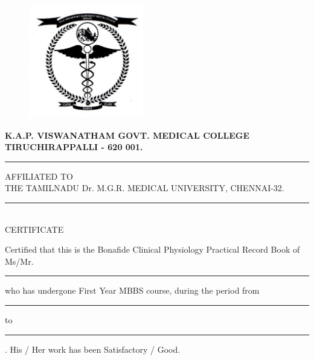 \documentclass[a4paper,12pt]{book}
\begin{document}
\newpage
\vspace*{\fill}
\begin{center}
\begin{figure}[H]
	\centering
	\includegraphics[height=5cm,width=5cm]{./collegeEmblem/collegeEmblem.jpg}
\end{figure}
	\textbf{\Huge {K.A.P. VISWANATHAM GOVT. MEDICAL COLLEGE}}\\
	\textbf{\Large{TIRUCHIRAPPALLI - 620 001.}}\\

	\rule{4in}{0.5pt}
	\parbox{3.9in}{\centering AFFILIATED TO\\ THE TAMILNADU Dr. M.G.R. MEDICAL UNIVERSITY, CHENNAI-32.}
	\rule{4in}{0.5pt}\\
	{\centering \LARGE{CERTIFICATE\\}}
\end{center}
	\par
	Certified that this is the Bonafide Clinical Physiology Practical Record Book of Ms/Mr. \rule{3.5in}{.5pt}who has undergone First Year MBBS course, during the period from \rule{1in}{.5pt} to \rule{1in}{.5pt}.  His / Her work has been Satisfactory / Good.
\vspace*{\fill}
\end{document}
